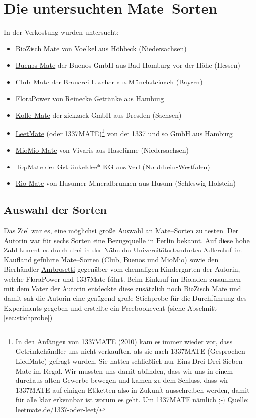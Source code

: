 \documentclass[11pt,a4paper,ngerman]{article}
\begin{document}
\section{Die untersuchten Mate--Sorten}
In der Verkostung wurden untersucht:
\begin{itemize}
 \item \href{http://www.voelkeljuice.de/sortiment/title/biozisch-mate/}{BioZisch Mate} von Voelkel aus Höhbeck (Niedersachsen)
 \item \href{http://www.buenos-icetea.com/buenos-mate/}{Buenos Mate} der Buenos GmbH aus Bad Homburg vor der Höhe (Hessen)
 \item \href{http://www.clubmate.de/}{Club--Mate} der Brauerei Loscher aus Münchsteinach (Bayern)
 \item \href{http://www.flora-power.de/}{FloraPower} von Reinecke Getränke aus Hamburg
 \item \href{http://kolle-mate.de/http://kolle-mate.de/}{Kolle--Mate} der zickzack GmbH aus Dresden (Sachsen)
 \item \href{http://leetmate.de/}{LeetMate} (oder 1337MATE)\footnote{In den Anfängen von 1337MATE (2010) kam es immer wieder vor, dass Getränkehändler uns nicht verkauften, als sie nach 1337MATE (Gesprochen LiedMate) gefragt wurden. Sie hatten schließlich nur Eins-Drei-Drei-Sieben-Mate im Regal.
Wir mussten uns damit abfinden, dass wir uns in einem durchaus alten Gewerbe bewegen und kamen zu dem Schluss, dass wir 1337MATE auf einigen Etiketten also in Zukunft ausschreiben werden, damit für alle klar erkennbar ist worum es geht. Um 1337MATE nämlich ;-) Quelle: \href{http://leetmate.de/1337-oder-leet/}{leetmate.de/1337-oder-leet/} }  von der 1337 und so GmbH aus Hamburg
 \item \href{http://www.vivaris.net/#c17}{MioMio Mate} von Vivaris aus Haselünne (Niedersachsen)
 \item \href{http://www.top-mate.de/}{TopMate} der GetränkeIdee* KG aus Verl (Nordrhein-Westfalen)
 \item \href{http://www.husumer-mineralbrunnen.de/produkte/rio-mate/}{Rio Mate} von Husumer Mineralbrunnen aus Husum  (Schleswig-Holstein)
\end{itemize}

\subsection{Auswahl der Sorten}
Das Ziel war es, eine möglichst große Auswahl an Mate--Sorten zu testen. Der Autorin war für sechs Sorten eine Bezugsquelle in Berlin bekannt. Auf diese hohe Zahl kommt es durch drei in der Nähe des Universitätsstandortes Adlershof im Kaufland geführte Mate--Sorten (Club, Buenos und MioMio) sowie den Bierhändler \href{http://www.ambrosetti.de/}{Ambrosetti} gegenüber vom ehemaligen Kindergarten der Autorin, welche FloraPower und 1337Mate führt. Beim Einkauf im Bioladen zusammen mit dem Vater der Autorin entdeckte diese zusätzlich noch BioZisch Mate und damit sah die Autorin eine genügend große Stichprobe für die Durchführung des Experiments gegeben und erstellte ein Facebookevent (siehe Abschnitt \ref{sec:stichprobe})
\end{document}
